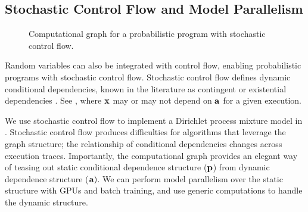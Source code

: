 \subsection{Stochastic Control Flow and Model Parallelism}

\begin{figure}[!htb]
  \centering
  
\caption{Computational graph for a probabilistic program with stochastic control flow.
}
\label{fig:dynamic}
\end{figure}

Random variables can also be integrated with control flow,
enabling probabilistic programs with stochastic control flow.
%
Stochastic control flow defines dynamic conditional dependencies,
known in the literature as contingent or existential dependencies
\citep{mansinghka2014venture,wu2016swift}.
See , where $\boldsymbol{\mathbf{x}}$ may or may not depend on $\boldsymbol{\mathbf{a}}$
for a given execution.

We use stochastic control flow to implement a Dirichlet process mixture model
in .
Stochastic control flow produces difficulties for algorithms that leverage the
graph structure; the relationship of conditional dependencies
changes across execution traces.
Importantly, the computational graph provides
an elegant way of teasing out static conditional dependence structure
($\boldsymbol{\mathbf{p}}$) from dynamic dependence structure ($\boldsymbol{\mathbf{a}})$.  We can perform
model parallelism over the static structure with \glspl{GPU} and batch
training, and use generic computations to handle the dynamic
structure.

